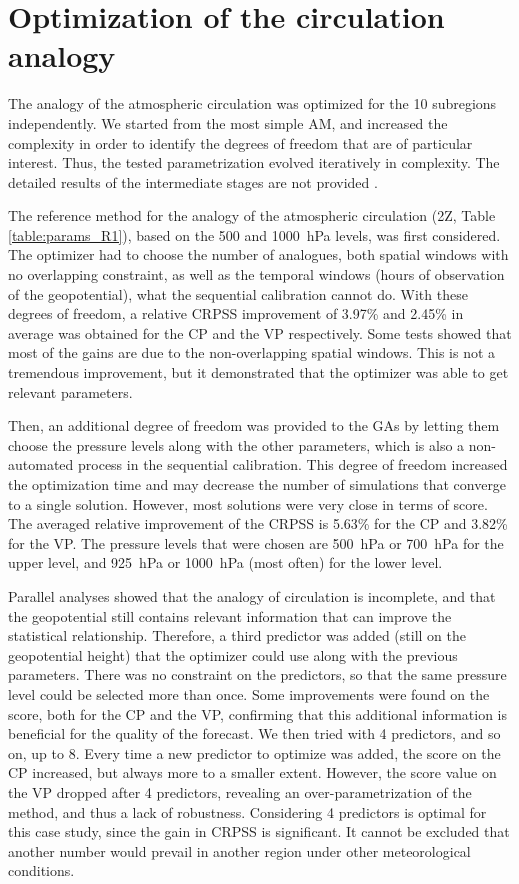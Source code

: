 \documentclass[5p]{elsarticle}
\begin{document}
\section{Optimization of the circulation analogy}
\label{sec:optim_circul}

The analogy of the atmospheric circulation was optimized for the 10 subregions  independently. We started from the most simple AM, and increased the complexity in order to identify the degrees of freedom that are of particular interest. Thus, the tested parametrization evolved iteratively in complexity. The detailed results of the intermediate stages are not provided \citep[see][for the details]{Horton2012a}.

The reference method for the analogy of the atmospheric circulation (2Z, Table \ref{table:params_R1}), based on the 500 and 1000~hPa levels, was first considered. The optimizer had to choose the number of analogues, both spatial windows with no overlapping constraint, as well as the temporal windows (hours of observation of the geopotential), what the sequential calibration cannot do. With these degrees of freedom, a relative CRPSS improvement of 3.97\% and 2.45\% in average was obtained for the CP and the VP respectively. Some tests showed that most of the gains are due to the non-overlapping spatial windows. This is not a tremendous improvement, but it demonstrated that the optimizer was able to get relevant parameters.

Then, an additional degree of freedom was provided to the GAs by letting them choose the pressure levels along with the other parameters, which is also a non-automated process in the sequential calibration. This degree of freedom increased the optimization time and may decrease the number of simulations that converge to a single solution. However, most solutions were very close in terms of score. The averaged relative improvement of the CRPSS is 5.63\% for the CP and 3.82\% for the VP. The pressure levels that were chosen are 500~hPa or 700~hPa for the upper level, and 925~hPa or 1000~hPa (most often) for the lower level.

Parallel analyses showed that the analogy of circulation is incomplete, and that the geopotential still contains relevant information that can improve the statistical relationship. Therefore, a third predictor was added (still on the geopotential height) that the optimizer could use along with the previous parameters. There was no constraint on the predictors, so that the same pressure level could be selected more than once. Some improvements were found on the score, both for the CP and the VP, confirming that this additional information is beneficial for the quality of the forecast. We then tried with 4 predictors, and so on, up to 8. Every time a new predictor to optimize was added, the score on the CP increased, but always more to a smaller extent. However, the score value on the VP dropped after 4 predictors, revealing an over-parametrization of the method, and thus a lack of robustness. Considering 4 predictors is optimal for this case study, since the gain in CRPSS is significant. It cannot be excluded that another number would prevail in another region under other meteorological conditions.
\end{document}
